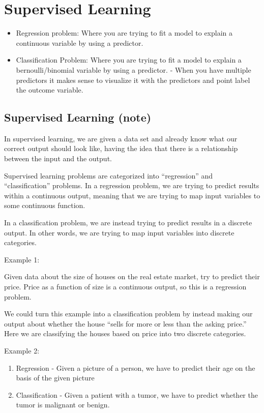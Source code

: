 \documentclass[
]{book}
\begin{document}
\hypertarget{supervised-learning}{%
\section{Supervised Learning}\label{supervised-learning}}

\begin{itemize}
\item
  Regression problem: Where you are trying to fit a model to explain a continuous variable by using a predictor.
\item
  Classification Problem: Where you are trying to fit a model to explain a bernoulli/binomial variable by using a predictor. - When you have multiple predictors it makes sense to visualize it with the predictors and point label the outcome variable.
\end{itemize}

\hypertarget{supervised-learning-note}{%
\subsection{Supervised Learning (note)}\label{supervised-learning-note}}

In supervised learning, we are given a data set and already know what our correct output should look like, having the idea that there is a relationship between the input and the output.

Supervised learning problems are categorized into ``regression'' and ``classification'' problems. In a regression problem, we are trying to predict results within a continuous output, meaning that we are trying to map input variables to some continuous function.

In a classification problem, we are instead trying to predict results in a discrete output. In other words, we are trying to map input variables into discrete categories.

Example 1:

Given data about the size of houses on the real estate market, try to predict their price. Price as a function of size is a continuous output, so this is a regression problem.

We could turn this example into a classification problem by instead making our output about whether the house ``sells for more or less than the asking price.'' Here we are classifying the houses based on price into two discrete categories.

Example 2:

\begin{enumerate}
\def\labelenumi{(\alph{enumi})}
\item
  Regression - Given a picture of a person, we have to predict their age on the basis of the given picture
\item
  Classification - Given a patient with a tumor, we have to predict whether the tumor is malignant or benign.
\end{enumerate}
\end{document}
